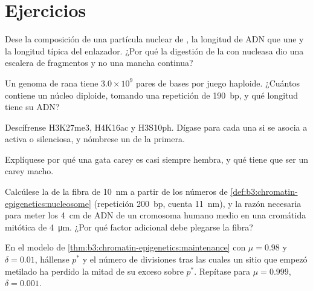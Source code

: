 \section{Ejercicios}

\begin{exercise}[$\star$]\label{exo:b3:chromatin-epigenetics:1}
Dese la composición de una partícula nuclear de , la longitud
de ADN que une y la longitud típica del enlazador. ¿Por qué la digestión
de la  con nucleasa dio una escalera de fragmentos y no una
mancha continua?
\end{exercise}

\begin{exercise}[$\star$]\label{exo:b3:chromatin-epigenetics:2}
Un genoma de rana tiene $3.0\times 10^{9}$ pares de bases por juego
haploide. ¿Cuántos  contiene un núcleo diploide, tomando una
repetición de \qty{190}{bp}, y qué longitud tiene su ADN?
\end{exercise}

\begin{exercise}[$\star$]\label{exo:b3:chromatin-epigenetics:3}
Descífrense H3K27me3, H4K16ac y H3S10ph. Dígase para cada una si se
asocia a  activa o silenciosa, y nómbrese un  de la
primera.
\end{exercise}

\begin{exercise}[$\star$]\label{exo:b3:chromatin-epigenetics:4}
Explíquese por qué una gata carey es casi siempre hembra, y qué tiene que
ser un carey macho.
\end{exercise}

\begin{exercise}[$\star\star$]\label{exo:b3:chromatin-epigenetics:5}
Calcúlese la  de la fibra de \qty{10}{nm} a
partir de los números de
\cref{def:b3:chromatin-epigenetics:nucleosome} (repetición \qty{200}{bp},
cuenta \qty{11}{nm}), y la razón necesaria para meter los \qty{4}{cm} de
ADN de un cromosoma humano medio en una cromátida mitótica de
\qty{4}{\micro m}. ¿Por qué factor adicional debe plegarse la fibra?
\end{exercise}

\begin{exercise}[$\star\star$]\label{exo:b3:chromatin-epigenetics:6}
En el modelo de \cref{thm:b3:chromatin-epigenetics:maintenance} con
$\mu = 0.98$ y $\delta = 0.01$, hállense $p^{*}$ y el número de
divisiones tras las cuales un sitio que empezó metilado ha perdido la
mitad de su exceso sobre $p^{*}$. Repítase para $\mu = 0.999$,
$\delta = 0.001$.
\end{exercise}

